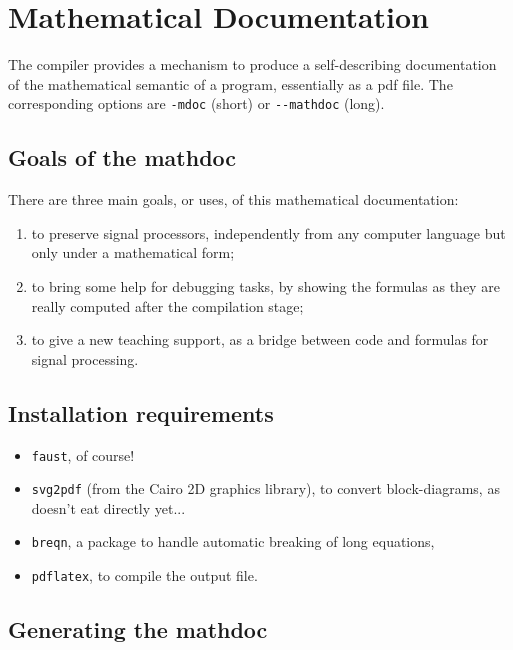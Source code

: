 \documentclass[a4paper,10pt]{book}
\begin{document}
\chapter{Mathematical Documentation}
\label{chapter:mdoc}

The \faust compiler provides a mechanism to produce a self-describing documentation of the mathematical semantic of a \faust program, essentially as a pdf file. The corresponding options are \lstinline!-mdoc! (short) or \lstinline!--mathdoc! (long).

\section{Goals of the mathdoc}
\label{sec:goals-of-mdoc}

There are three main goals, or uses, of this mathematical documentation:
\begin{enumerate}
\item to preserve signal processors, independently from any computer language but only under a mathematical form;
\item to bring some help for debugging tasks, by showing the formulas as they are really computed after the compilation stage;
\item to give a new teaching support, as a bridge between code and formulas for signal processing.
\end{enumerate}

\section{Installation requirements}
\label{sec:inst-requ}

\begin{itemize}
\item \lstinline!faust!, of course!
\item \lstinline!svg2pdf! (from the Cairo 2D graphics library), to convert block-diagrams, as \latex doesn't eat \svg directly yet...
\item \lstinline!breqn!, a \latex package to handle automatic breaking of long equations,
\item \lstinline!pdflatex!, to compile the \latex output file.
\end{itemize}


\section{Generating the mathdoc}
\label{sec:generating-mdoc}
\end{document}
